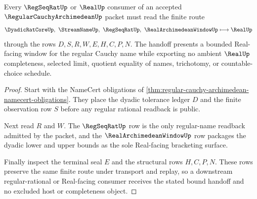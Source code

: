 \begin{theorem}
\label{thm:regular-cauchy-archimedean-real-bound-handoff}
Every $\RegSeqRatUp$ or $\RealUp$ consumer of an accepted $\RegularCauchyArchimedeanUp$ packet must read the finite route
$$
\DyadicRatCoreUp,\ \StreamNameUp,\ \RegSeqRatUp,\ \RealArchimedeanWindowUp \longmapsto \RealUp
$$
through the rows $D,S,R,W,E,H,C,P,N$. The handoff presents a bounded Real-facing window for the regular Cauchy name while exporting no ambient $\RealUp$ completeness, selected limit, quotient equality of names, trichotomy, or countable-choice schedule.
\end{theorem}
\begin{proof}
Start with the NameCert obligations of \autoref{thm:regular-cauchy-archimedean-namecert-obligations}. They place the dyadic tolerance ledger $D$ and the finite observation row $S$ before any regular rational readback is public.

Next read $R$ and $W$. The $\RegSeqRatUp$ row is the only regular-name readback admitted by the packet, and the $\RealArchimedeanWindowUp$ row packages the dyadic lower and upper bounds as the sole Real-facing bracketing surface.

Finally inspect the terminal seal $E$ and the structural rows $H,C,P,N$. These rows preserve the same finite route under transport and replay, so a downstream regular-rational or Real-facing consumer receives the stated bound handoff and no excluded host or completeness object.
\end{proof}




